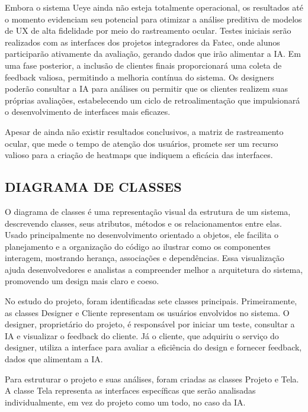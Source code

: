 Embora o sistema Ueye ainda não esteja totalmente operacional, os resultados até o momento evidenciam seu potencial para otimizar a análise preditiva de modelos de UX de alta fidelidade por meio do rastreamento ocular. Testes iniciais serão realizados com as interfaces dos projetos integradores da Fatec, onde alunos participarão ativamente da avaliação, gerando dados que irão alimentar a IA. Em uma fase posterior, a inclusão de clientes finais proporcionará uma coleta de feedback valiosa, permitindo a melhoria contínua do sistema. Os designers poderão consultar a IA para análises ou permitir que os clientes realizem suas próprias avaliações, estabelecendo um ciclo de retroalimentação que impulsionará o desenvolvimento de interfaces mais eficazes.

Apesar de ainda não existir resultados conclusivos, a matriz de rastreamento ocular, que mede o tempo de atenção dos usuários, promete ser um recurso valioso para a criação de heatmaps que indiquem a eficácia das interfaces.\newline

\subsection*{DIAGRAMA DE CLASSES}
O diagrama de classes é uma representação visual da estrutura de um sistema, descrevendo classes, seus atributos, métodos e os relacionamentos entre elas. Usado principalmente no desenvolvimento orientado a objetos, ele facilita o planejamento e a organização do código ao ilustrar como os componentes interagem, mostrando herança, associações e dependências. Essa visualização ajuda desenvolvedores e analistas a compreender melhor a arquitetura do sistema, promovendo um design mais claro e coeso. \textcite{Lucidchart}

No estudo do projeto, foram identificadas sete classes principais. Primeiramente, as classes Designer e Cliente representam os usuários envolvidos no sistema. O designer, proprietário do projeto, é responsável por iniciar um teste, consultar a IA e visualizar o feedback do cliente. Já o cliente, que adquiriu o serviço do designer, utiliza a interface para avaliar a eficiência do design e fornecer feedback, dados que alimentam a IA.

Para estruturar o projeto e suas análises, foram criadas as classes Projeto e Tela. A classe Tela representa as interfaces específicas que serão analisadas individualmente, em vez do projeto como um todo, no caso da IA.

